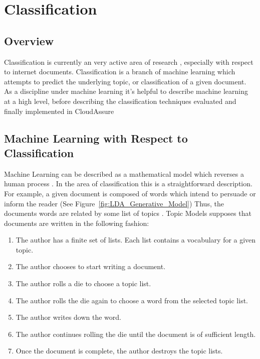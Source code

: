 \section{Classification}
\label{sec:classification}
\subsection{Overview}
Classification is currently an
very active area of research \autocite{Zhang2000}, especially with respect to
internet documents. Classification is a branch of machine learning which
attempts to predict the underlying topic, or classification of a given document.
As a discipline under machine learning it's helpful to describe machine learning
at a high level, before describing the classification techniques evaluated and
finally implemented in CloudAssure

\subsection{Machine Learning with Respect to Classification}
Machine Learning can be described as a mathematical model which reverses a human
process \autocite{Bishop2009}. In the area of classification this is
a straightforward description. For example, a given document is composed of words which
intend to persuade or inform the reader (See
Figure~\ref{fig:LDA_Generative_Model}) Thus, the documents words are related
by some list of topics \autocite{Blei2009}. Topic Models supposes that documents are
written in the following fashion:
\begin{enumerate}
    \item The author has a finite set of lists. Each list contains a vocabulary
        for a given topic.
    \item The author chooses to start writing a document.
    \item The author rolls a die to choose a topic list.
    \item The author rolls the die again to choose a word from the selected
        topic list.
    \item The author writes down the word.
    \item The author continues rolling the die until the document is of sufficient
        length.
    \item Once the document is complete, the author destroys the topic lists.
\end{enumerate}

